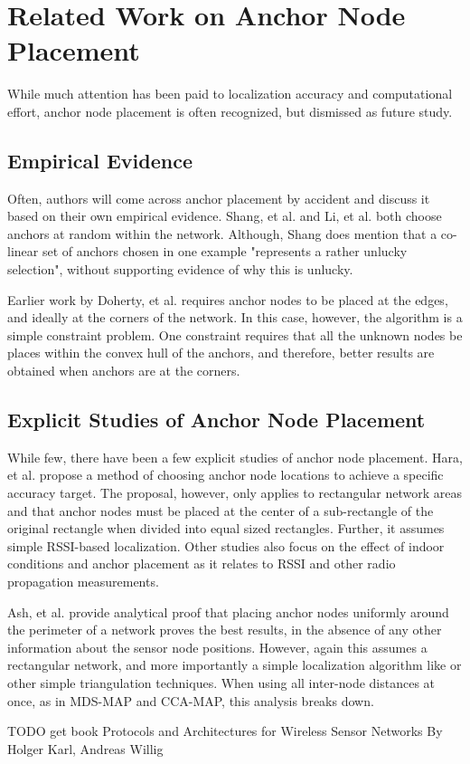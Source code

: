 \chapter{Related Work on Anchor Node Placement}

While much attention has been paid to localization accuracy and computational effort, anchor node placement is often recognized, but dismissed as future study.   

\section{Empirical Evidence}

Often, authors will come across anchor placement by accident and discuss it based on their own empirical evidence.  Shang, et al.\cite[p. 964]{MDS-MAP} and Li, et al.\cite[p. 11]{CCA-MAP07} both choose anchors at random within the network.  Although, Shang does mention that a co-linear set of anchors chosen in one example "represents a rather unlucky selection", without supporting evidence of why this is unlucky.

Earlier work by Doherty, et al.\cite{Doherty} requires anchor nodes to be placed at the edges, and ideally at the corners of the network.  In this case, however, the algorithm is a simple constraint problem.  One constraint requires that all the unknown nodes be places within the convex hull of the anchors, and therefore, better results are obtained when anchors are at the corners.

\section{Explicit Studies of Anchor Node Placement}
While few, there have been a few explicit studies of anchor node placement.  Hara, et al.\cite{Hara} propose a method of choosing anchor node locations to achieve a specific accuracy target.  The proposal, however, only applies to rectangular network areas and that anchor nodes must be placed at the center of a sub-rectangle of the original rectangle when divided into equal sized rectangles.  Further, it assumes simple RSSI-based localization.  Other studies also focus on the effect of indoor conditions and anchor placement as it relates to RSSI and other radio propagation measurements\cite{Zemek}.

Ash, et al.\cite{Ash} provide analytical proof that placing anchor nodes uniformly around the perimeter of a network proves the best results, in the absence of any other information about the sensor node positions. However, again this assumes a rectangular network, and more importantly a simple localization algorithm like \cite{Doherty} or other simple triangulation techniques.  When using all inter-node distances at once, as in MDS-MAP and CCA-MAP, this analysis breaks down.

TODO get book Protocols and Architectures for Wireless Sensor Networks By Holger Karl, Andreas Willig
